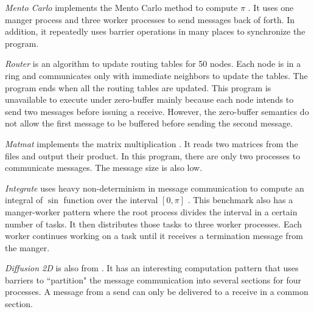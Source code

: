 \begin{compactitem}
\item \textit{Mento Carlo} implements the Mento Carlo method to compute $\pi$ \cite{benchmark:mentoCarlo}. It uses one manger process and three worker processes to send messages back of forth. In addition, it repeatedly uses barrier operations in many places to synchronize the program. 
\item \textit{Router} is an algorithm to update routing tables for 50 nodes. Each node is in a ring and communicates only with immediate neighbors to update the tables. The program ends when all the routing tables are updated. This program is unavailable to execute under zero-buffer mainly because each node intends to send two messages before issuing a receive. However, the zero-buffer semantics do not allow the first message to be buffered before sending the second message.
\item \textit{Matmat} implements the matrix multiplication \cite{benchmark:fevs}. It reads two matrices from the files and output their product. In this program, there are only two processes to communicate messages. The message size is also low.
\item \textit{Integrate} uses heavy non-determinism in message communication to compute an integral of $\sin$ function over the interval $[0, \pi]$ \cite{benchmark:fevs}. This benchmark also has a manger-worker pattern where the root process divides the interval in a certain number of tasks. It then distributes those tasks to three worker processes. Each worker continues working on a task until it receives a termination message from the manger.
\item \textit{Diffusion 2D} is also from \cite{benchmark:fevs}. It has an interesting computation pattern that uses barriers to ``partition" the message communication into several sections for four processes. A message from a send can only be delivered to a receive in a common section. 

\end{compactitem}


